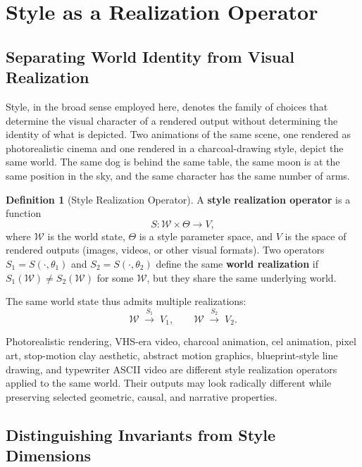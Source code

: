 \documentclass[12pt,a4paper]{article}
\theoremstyle{plain}
\theoremstyle{definition}
\newtheorem{definition}[theorem]{Definition}
\theoremstyle{remark}
\begin{document}
\section{Style as a Realization Operator}
\label{sec:style}

\subsection{Separating World Identity from Visual Realization}

Style, in the broad sense employed here, denotes the family of choices that determine the visual character of a rendered output without determining the identity of what is depicted. Two animations of the same scene, one rendered as photorealistic cinema and one rendered in a charcoal-drawing style, depict the same world. The same dog is behind the same table, the same moon is at the same position in the sky, and the same character has the same number of arms.

\begin{definition}[Style Realization Operator]
A \textbf{style realization operator} is a function
\[
S: \mathcal{W} \times \Theta \to V,
\]
where $\mathcal{W}$ is the world state, $\Theta$ is a style parameter space, and $V$ is the space of rendered outputs (images, videos, or other visual formats). Two operators $S_1 = S(\cdot, \theta_1)$ and $S_2 = S(\cdot, \theta_2)$ define the same \textbf{world realization} if $S_1(\mathcal{W}) \neq S_2(\mathcal{W})$ for some $\mathcal{W}$, but they share the same underlying world.
\end{definition}

The same world state thus admits multiple realizations:
\[
\mathcal{W} \;\xrightarrow{S_1}\; V_1, \qquad \mathcal{W} \;\xrightarrow{S_2}\; V_2.
\]

Photorealistic rendering, VHS-era video, charcoal animation, cel animation, pixel art, stop-motion clay aesthetic, abstract motion graphics, blueprint-style line drawing, and typewriter ASCII video are different style realization operators applied to the same world. Their outputs may look radically different while preserving selected geometric, causal, and narrative properties.

\subsection{Distinguishing Invariants from Style Dimensions}
\end{document}
